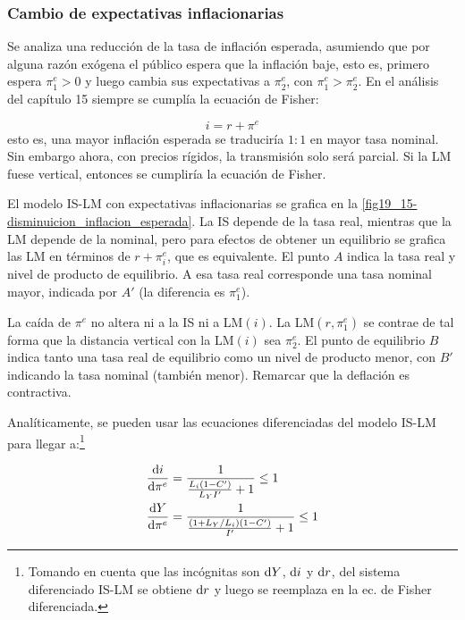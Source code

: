 \documentclass[DeGregorioResumen]{subfiles}
\begin{document}


\subsubsection{Cambio de expectativas inflacionarias}

Se analiza una reducción de la tasa de inflación esperada, asumiendo que por alguna razón exógena el público espera que la inflación baje, esto es, primero espera $\pi^e_1>0$ y luego cambia sus expectativas a $\pi^e_2$, con $\pi^e_1>\pi^e_2$. En el análisis del capítulo 15 siempre se cumplía la ecuación de Fisher:

\[
i = r + \pi^e
\]
esto es, una mayor inflación esperada se traduciría $1:1$ en mayor tasa nominal. Sin embargo ahora, con precios rígidos, la transmisión solo será parcial. Si la LM fuese vertical, entonces se cumpliría la ecuación de Fisher.

El modelo IS-LM con expectativas inflacionarias se grafica en la \autoref{fig19_15-disminuicion_inflacion_esperada}. La IS depende de la tasa real, mientras que la LM depende de la nominal, pero para efectos de obtener un equilibrio se grafica las LM en términos de $r+\pi^e_i$, que es equivalente. El punto $A$ indica la tasa real y nivel de producto de equilibrio. A esa tasa real corresponde una tasa nominal mayor, indicada por $A'$ (la diferencia es $\pi^e_1$).

La caída de $\pi^e$ no altera ni a la IS ni a LM$(i)$. La LM$(r,\pi^e_1)$ se contrae de tal forma que la distancia vertical con la LM$(i)$ sea $\pi^e_2$. El punto de equilibrio $B$ indica tanto una tasa real de equilibrio como un nivel de producto menor, con $B'$ indicando la tasa nominal (también menor). Remarcar que la deflación es contractiva.



Analíticamente, se pueden usar las ecuaciones diferenciadas del modelo IS-LM para llegar a:\footnote{Tomando en cuenta que las incógnitas son $\mathop{}\!\mathrm{d} Y$, $\mathop{}\!\mathrm{d} i$ y $\mathop{}\!\mathrm{d} r$, del sistema diferenciado IS-LM se obtiene $\mathop{}\!\mathrm{d} r$  y luego se reemplaza en la ec. de Fisher diferenciada.}

\begin{align}
	\frac{\mathrm{d}i}{\mathrm{d}\pi^e} &= \frac{1}{\frac{L_i(1-C')}{L_Y I'}+1} \leq 1 \\
	\frac{\mathrm{d}Y}{\mathrm{d}\pi^e} &= \frac{1}{\frac{(1+L_Y/L_i)(1-C')}{I'}+1} \leq 1
\end{align}
\end{document}
